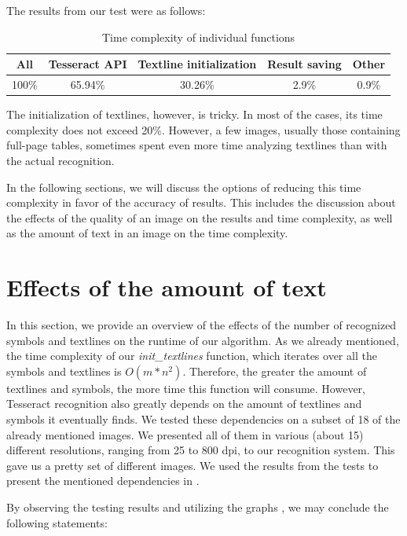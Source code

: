 The results from our test were as follows:

\begin{table}[H]
\centering
\begin{tabular}{ccccc}
\toprule
\textbf{All} & \textbf{Tesseract API} & \textbf{Textline initialization} & \textbf{Result saving} & \textbf{Other}\\
\midrule
100\% & 65.94\% & 30.26\% & 2.9\% & 0.9\% \\
\bottomrule
\end{tabular}
\caption{Time complexity of individual functions} 
\label{table:forward-inverted}
\end{table}

The initialization of textlines, however, is tricky. In most of the cases, its time complexity does not exceed 20\%. However, a few images, usually those containing full-page tables, sometimes spent even more time analyzing textlines than with the actual recognition.

In the following sections, we will discuss the options of reducing this time complexity in favor of the accuracy of results. This includes the discussion about the effects of the quality of an image on the results and time complexity, as well as the amount of text in an image on the time complexity.

\section{Effects of the amount of text}

In this section, we provide an overview of the effects of the number of recognized symbols and textlines on the runtime of our algorithm. As we already mentioned, the time complexity of our \emph{init\_textlines} function, which iterates over all the symbols and textlines is $O(m*n^2)$. Therefore, the greater the amount of textlines and symbols, the more time this function will consume. However, Tesseract recognition also greatly depends on the amount of textlines and symbols it eventually finds. We tested these dependencies on a subset of 18 of the already mentioned images. We presented all of them in various (about 15) different resolutions, ranging from 25 to 800 dpi, to our recognition system. 
This gave us a pretty  set of different images. We used the results from the tests to present the mentioned dependencies in .

By observing the testing results and utilizing the graphs , we may conclude the following statements:

